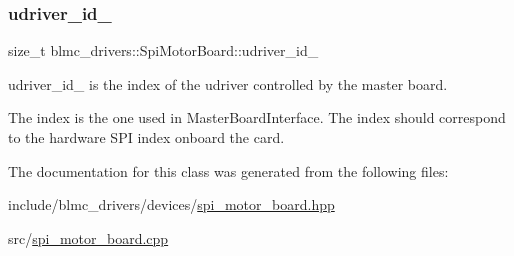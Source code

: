 \subsubsection{\texorpdfstring{udriver\+\_\+id\+\_\+}{udriver\_id\_}}
{\footnotesize\ttfamily size\+\_\+t blmc\+\_\+drivers\+::\+Spi\+Motor\+Board\+::udriver\+\_\+id\+\_\+\hspace{0.3cm}{\ttfamily [private]}}



udriver\+\_\+id\+\_\+ is the index of the udriver controlled by the master board. 

The index is the one used in Master\+Board\+Interface. The index should correspond to the hardware S\+PI index onboard the card. 

The documentation for this class was generated from the following files\+:\begin{DoxyCompactItemize}
\item 
include/blmc\+\_\+drivers/devices/\hyperlink{spi__motor__board_8hpp}{spi\+\_\+motor\+\_\+board.\+hpp}\item 
src/\hyperlink{spi__motor__board_8cpp}{spi\+\_\+motor\+\_\+board.\+cpp}\end{DoxyCompactItemize}
